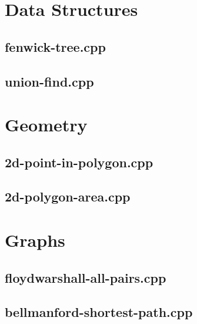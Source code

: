\documentclass[10pt,twocolumn,landscape]{article}
\author{Make Programming Great Again™}
\begin{document}
\maketitle
\clearpage

\section{Data Structures}

\subsection{fenwick-tree.cpp}


\subsection{union-find.cpp}


\section{Geometry}

\subsection{2d-point-in-polygon.cpp}


\subsection{2d-polygon-area.cpp}


\section{Graphs}

\subsection{floydwarshall-all-pairs.cpp}


\subsection{bellmanford-shortest-path.cpp}

\end{document}

